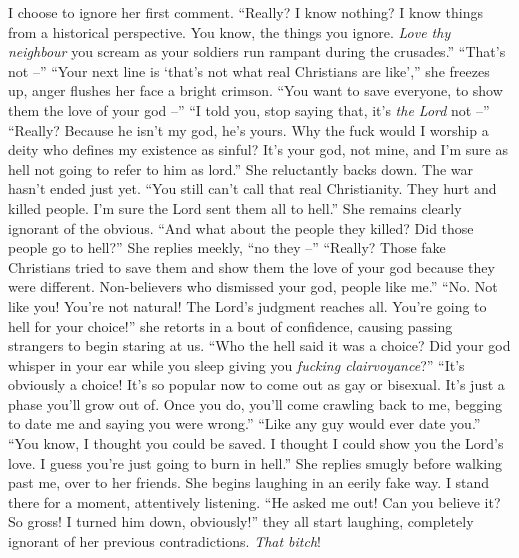 \documentclass[a4paper, 12pt]{book}
\begin{document}
\begin{CJK*}{UTF8}{min}
\newline
\tab
I choose to ignore her first comment. ``Really? I know nothing? I know things from a historical perspective. You know, the things you ignore. \textit{Love thy neighbour} you scream as your soldiers run rampant during the crusades.''
\newline
\tab
``That’s not --''
\newline
\tab
``Your next line is ‘that’s not what real Christians are like’,'' she freezes up, anger flushes her face a bright crimson. ``You want to save everyone, to show them the love of your god --''
\newline
\tab
``I told you, stop saying that, it’s \textit{the Lord} not --''
\newline
\tab
``Really? Because he isn’t my god, he’s yours. Why the fuck would I worship a deity who defines my existence as sinful? It’s your god, not mine, and I’m sure as hell not going to refer to him as lord.'' She reluctantly backs down. The war hasn’t ended just yet.
\newline
\tab
``You still can’t call that real Christianity. They hurt and killed people. I’m sure the Lord sent them all to hell.'' She remains clearly ignorant of the obvious.
\newline
\tab
``And what about the people they killed? Did those people go to hell?''
\newline
\tab
She replies meekly, ``no they --''
\newline
\tab
``Really? Those fake Christians tried to save them and show them the love of your god because they were different. Non-believers who dismissed your god, people like me.''
\newline
\tab
``No. Not like you! You’re not natural! The Lord’s judgment reaches all. You’re going to hell for your choice!'' she retorts in a bout of confidence, causing passing strangers to begin staring at us.
\newline
\tab
``Who the hell said it was a choice? Did your god whisper in your ear while you sleep giving you \textit{fucking clairvoyance}?''
\newline
\tab
``It’s obviously a choice! It’s so popular now to come out as gay or bisexual. It’s just a phase you’ll grow out of. Once you do, you’ll come crawling back to me, begging to date me and saying you were wrong.''
\newline
\tab
``Like any guy would ever date you.''
\newline
\tab
``You know, I thought you could be saved. I thought I could show you the Lord’s love. I guess you’re just going to burn in hell.'' She replies smugly before walking past me, over to her friends. She begins laughing in an eerily fake way. I stand there for a moment, attentively listening. ``He asked me out! Can you believe it? So gross! I turned him down, obviously!'' they all start laughing, completely ignorant of her previous contradictions. \textit{That bitch}!

\end{CJK*}
\end{document}
